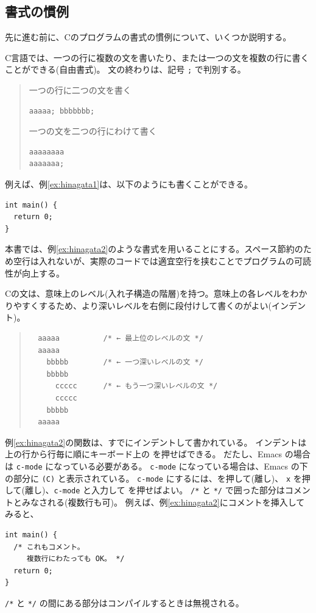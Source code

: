 \subsection{書式の慣例}

先に進む前に、Cのプログラムの書式の慣例について、いくつか説明する。

C言語では、一つの行に複数の文を書いたり、または一つの文を複数の行に書くことができる(自由書式)。
文の終わりは、記号 \verb+;+ で判別する。
\begin{quote}
  一つの行に二つの文を書く
\begin{verbatim}
aaaaa; bbbbbbb;
\end{verbatim}
  一つの文を二つの行にわけて書く
\begin{verbatim}
aaaaaaaa
aaaaaaa;
\end{verbatim}
\end{quote}
例えば、例\ref{ex:hinagata1}は、以下のようにも書くことができる。
\begin{reidai}\label{ex:hinagata2}
\begin{verbatim}
int main() {
  return 0;
}
\end{verbatim}
\end{reidai} \noindent
本書では、例\ref{ex:hinagata2}のような書式を用いることにする。スペース節約のため空行は入れないが、実際のコードでは適宜空行を挟むことでプログラムの可読性が向上する。

Cの文は、意味上のレベル(入れ子構造の階層)を持つ。意味上の各レベルをわかりやすくするため、より深いレベルを右側に段付けして書くのがよい(インデント)。
\begin{quote}
\begin{verbatim}
  aaaaa          /* ← 最上位のレベルの文 */
  aaaaa
    bbbbb        /* ← 一つ深いレベルの文 */
    bbbbb
      ccccc      /* ← もう一つ深いレベルの文 */
      ccccc
    bbbbb
  aaaaa
\end{verbatim}
\end{quote}
例\ref{ex:hinagata2}の関数は、すでにインデントして書かれている。
インデントは上の行から行毎に順にキーボード上の \tabkey を押せばできる。
だたし、Emacs の場合は \verb+c-mode+ になっている必要がある。
\verb+c-mode+ になっている場合は、Emacs の下の部分に \verb+(C)+ と表示されている。
\verb+c-mode+ にするには、\esckey を押して(離し)、
\verb+x+ を押して(離し)、\verb+c-mode+ と入力して \ret を押せばよい。
\verb+/*+ と \verb+*/+ で囲った部分はコメントとみなされる(複数行も可)。
例えば、例\ref{ex:hinagata2}にコメントを挿入してみると、
\begin{reidai}
\begin{verbatim}
int main() {
  /* これもコメント。
     複数行にわたっても OK。 */
  return 0;
}
\end{verbatim}
\end{reidai} \noindent
\verb+/*+ と \verb+*/+ の間にある部分はコンパイルするときは無視される。

